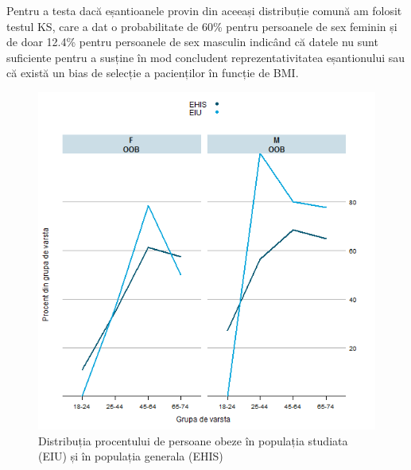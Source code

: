 \documentclass[12pt,draft]{article}
\begin{document}
  Pentru a testa dacă eșantioanele provin din aceeași distribuție comună am folosit testul \ac{KS}, care a dat o probabilitate de 60\% pentru persoanele de sex feminin și de doar 12.4\% pentru persoanele de sex masculin indicând că datele nu sunt suficiente pentru a susține în mod concludent reprezentativitatea eșantionului sau că există un bias de selecție a pacienților în funcție de \ac{BMI}.
  \begin{figure}[H]
    \centering
    \includegraphics[width=0.8\linewidth]{incoBMIvsEHIS-OOB}
    \caption{Distribuția procentului de persoane obeze în populația studiata (EIU) și în populația generala (EHIS) }
    \label{fig:incoBMIvsEHIS-OOB}
  \end{figure}
\end{document}
